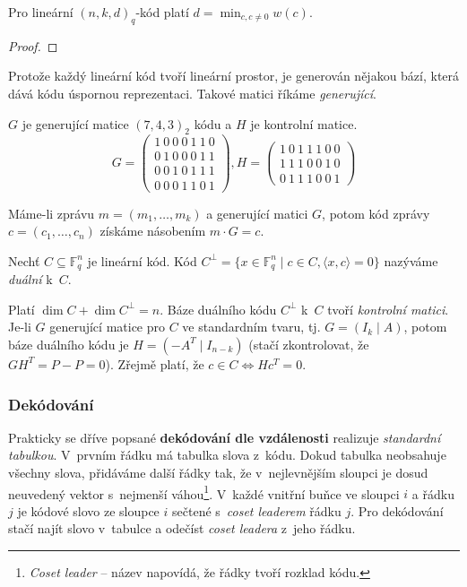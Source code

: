 \begin{claim}
Pro lineární $(n,k,d)_q$-kód platí $d = \min_{c, c \neq 0} w(c)$.
\end{claim}

\begin{proof}
\end{proof}

Protože každý lineární kód tvoří lineární prostor, je generován nějakou
bází, která dává kódu úspornou reprezentaci. Takové matici říkáme
{\em generující}.

\begin{example}
    $G$ je generující matice $(7,4,3)_2$ kódu
    a $H$ je kontrolní matice.
\[
G =
\begin{pmatrix}
    1\ 0\ 0\ 0\ 1\ 1\ 0 \\
    0\ 1\ 0\ 0\ 0\ 1\ 1 \\
    0\ 0\ 1\ 0\ 1\ 1\ 1 \\
    0\ 0\ 0\ 1\ 1\ 0\ 1
\end{pmatrix},
H =
\begin{pmatrix}
    1\ 0\ 1\ 1\ 1\ 0\ 0 \\
    1\ 1\ 1\ 0\ 0\ 1\ 0 \\
    0\ 1\ 1\ 1\ 0\ 0\ 1
\end{pmatrix}
\]

\end{example}

Máme-li zprávu $m = (m_1,\ldots,m_k)$ a generující matici $G$,
potom kód zprávy $c = (c_1, \ldots, c_n)$
získáme násobením $m \cdot G = c$.

\begin{definition}
    Nechť $C \subseteq \mathbb{F}^n_q$ je lineární kód.
    Kód $C^\bot = \{ x \in \mathbb{F}^n_q \mid c \in C, \langle x,c \rangle = 0 \}$
    nazýváme {\em duální} k~$C$.
\end{definition}

Platí $\dim C + \dim C^\bot = n$.
Báze duálního kódu $C^\bot$ k~$C$ tvoří {\em kontrolní matici}.
Je-li $G$ generující matice pro $C$ ve standardním tvaru, tj.
$G = (I_k \mid A)$, potom báze duálního kódu je $H = (-A^T \mid I_{n - k})$
(stačí zkontrolovat, že $GH^T = P - P = 0$).
Zřejmě platí, že $c \in C \iff Hc^T = 0$.


\subsubsection{Dekódování}

Prakticky se dříve popsané {\bf dekódování dle vzdálenosti} realizuje
{\em standardní tabulkou}. V~prvním řádku má tabulka slova z~kódu. Dokud
tabulka neobsahuje všechny slova, přidáváme další řádky tak, že
v~nejlevnějším sloupci je dosud neuvedený vektor s~nejmenší
váhou\footnote{{\em Coset leader} -- název napovídá, že řádky tvoří
rozklad kódu.}. V~každé vnitřní buňce ve sloupci $i$ a řádku $j$ je
kódové slovo ze sloupce $i$ sečtené s~{\em coset leaderem} řádku $j$.
Pro dekódování stačí najít slovo v~tabulce a odečíst {\em coset leadera}
z~jeho řádku.

